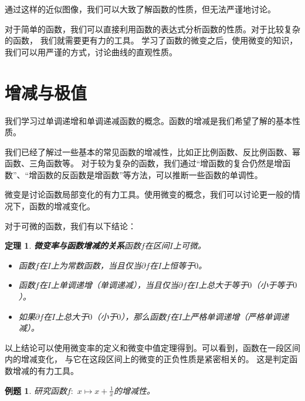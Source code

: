 \documentclass[12pt,UTF8]{ctexbook}
\newtheorem{tm}{定理}[section]
\newtheorem{et}{例题}[section]
\begin{document}
通过这样的近似图像，我们可以大致了解函数的性质，但无法严谨地讨论。

对于简单的函数，我们可以直接利用函数的表达式分析函数的性质。对于比较复杂的函数，
我们就需要更有力的工具。
学习了函数的微变之后，使用微变的知识，我们可以用严谨的方式，讨论曲线的直观性质。

\section{增减与极值}

我们学习过单调递增和单调递减函数的概念。函数的增减是我们希望了解的基本性质。

我们已经了解过一些基本的常见函数的增减性，比如正比例函数、反比例函数、幂函数、三角函数等。
对于较为复杂的函数，我们通过“增函数的复合仍然是增函数”、“增函数的反函数是增函数”等方法，可以推断一些函数的单调性。

微变是讨论函数局部变化的有力工具。使用微变的概念，我们可以讨论更一般的情况下，函数的增减变化。

对于可微的函数，我们有以下结论：
\begin{tm}{\textbf{微变率与函数增减的关系}}\label{tm:3-1-0}
    函数$f$在区间$I$上可微。
    \begin{itemize}
        \item 函数$f$在$I$上为常数函数，当且仅当$\partial f$在$I$上恒等于$0$。
        \item 函数$f$在$I$上单调递增（单调递减），当且仅当$\partial f$在$I$上总大于等于$0$（小于等于$0$）。
        \item 如果$\partial f$在$I$上总大于$0$（小于$0$），那么函数$f$在$I$上严格单调递增（严格单调递减）。
    \end{itemize} 
\end{tm}
以上结论可以使用微变率的定义和微变中值定理得到。可以看到，函数在一段区间内的增减变化，
与它在这段区间上的微变的正负性质是紧密相关的。
这是判定函数增减的有力工具。

\begin{et}
    研究函数$f:\,\,x\mapsto x + \frac{1}{x}$的增减性。
\end{et}
\end{document}
